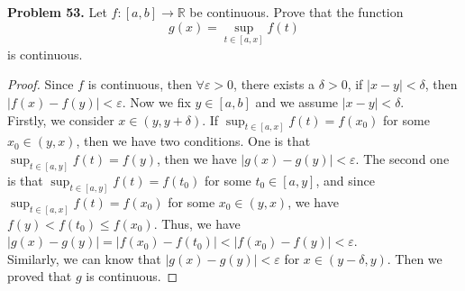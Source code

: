 \documentclass[12pt,leqno]{amsart}
\begin{document}
\noindent
{\bf Problem 53.}
Let $f:[a,b]\to\mathbb{R}$ be continuous. Prove that the function
$$
g(x) = \sup_{t\in[a,x]}f(t)
$$
is continuous.
\begin{proof}
Since $f$ is continuous, then $\forall \varepsilon>0$, there exists a $\delta>0$, if $|x-y|<\delta$, then $|f(x)-f(y)|<\varepsilon$. Now we fix $y\in [a,b]$ and we assume $|x-y|<\delta$. \\
\hspace*{3em}Firstly, we consider $x\in(y,y+\delta)$. If $\sup_{t\in[a,x]}f(t) = f(x_0)$ for some $x_0\in(y,x)$, then we have two conditions. One is that $\sup_{t\in[a,y]}f(t) = f(y)$, then we have $|g(x)-g(y)|<\varepsilon$. The second one is that $\sup_{t\in[a,y]}f(t) = f(t_0)$ for some $t_0\in[a,y]$, and since $\sup_{t\in[a,x]}f(t) = f(x_0)$ for some $x_0\in(y,x)$, we have $f(y) < f(t_0)\leq f(x_0)$. Thus, we have $|g(x)-g(y)|=|f(x_0)-f(t_0)|<|f(x_0)-f(y)|<\varepsilon$. \\
\hspace*{3em}Similarly, we can know that $|g(x)-g(y)|<\varepsilon$ for $x\in(y-\delta, y)$. Then we proved that $g$ is continuous.
\end{proof}

\medskip
\end{document}
